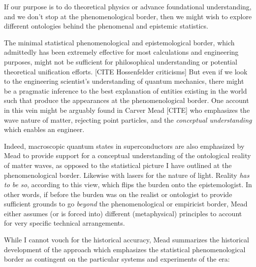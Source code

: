 If our purpose is to do theoretical physics or advance foundational understanding, and we don't stop at the phenomenological border, then we might wish to explore different ontologies behind the phenomenal and epistemic statistics. 

The minimal statistical phenomenological and epistemological border, which admittedly has been extremely effective for most calculations and engineering purposes, might not be sufficient for philosophical understanding or potential theoretical unification efforts. [CITE  Hossenfelder criticisms]  But even if we look to the engineering scientist's understanding of quantum mechanics, there might be a pragmatic inference to the best explanation of entities existing in the world such that produce the appearances at the phenomenological border.  One account in this vein might be arguably found in Carver Mead [CITE] who emphasizes the wave nature of matter, rejecting point particles, and the \emph{conceptual understanding} which enables an engineer.

Indeed, macroscopic quantum states in superconductors are also emphasized by Mead to provide support for a conceptual understanding of the ontological reality of matter waves, as opposed to the statistical picture I have outlined at the phenomenological border.  Likewise with lasers for the nature of light.  Reality \emph{has to be so}, according to this view, which flips the burden onto the epistemologist.  In other words, if before the burden was on the realist or ontologist to provide sufficient grounds to go \emph{beyond} the phenomenological or empiricist border, Mead either assumes (or is forced into) different (metaphysical) principles to account for very specific technical arrangements.  

While I cannot vouch for the historical accuracy, Mead summarizes the historical development of the approach which emphasizes the statistical phenomenological border as contingent on the particular systems and experiments of the era:

